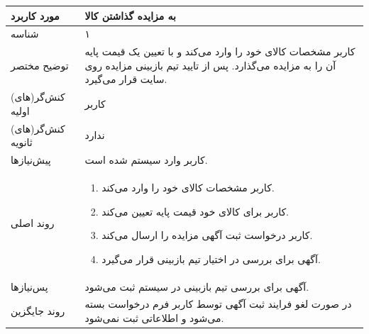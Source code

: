 \documentclass{article}
\begin{document}
\begin{center}
\bgroup
\def\arraystretch{1.5}
\begin{tabular} {|p{}|p{}|}
\hline
 مورد کاربرد & 
 به مزایده گذاشتن کالا
\\ \hline
 شناسه &
۱
\\ \hline
توضیح مختصر &
کاربر مشخصات کالای خود را وارد می‌کند و با تعیین یک قیمت پایه آن را به مزایده می‌گذارد.
پس از تایید تیم بازبینی مزایده روی سایت قرار می‌گیرد.
\\ \hline
کنش‌گر(های) اولیه &
کاربر
\\ \hline
کنش‌گر(های) ثانویه &
ندارد
\\ \hline
پیش‌نیازها &
کاربر وارد سیستم شده است.
\\ \hline
روند اصلی &
\begin{enumerate}[nosep,topsep=0cm]
\item
کاربر مشخصات کالای خود را وارد می‌کند.
\item
کاربر برای کالای خود قیمت پایه تعیین می‌کند.
\item
کاربر درخواست ثبت آگهی مزایده را ارسال می‌کند.
\item
آگهی برای بررسی در اختیار تیم بازبینی قرار می‌گیرد.
\end{enumerate}
\\ \hline
پس‌نیازها &
آگهی برای بررسی تیم بازبینی در سیستم ثبت می‌شود.
\\ \hline
روند جایگزین &
در صورت لغو فرایند ثبت آگهی توسط کاربر فرم درخواست بسته می‌شود و اطلاعاتی ثبت نمی‌شود.
\\ \hline
\end{tabular}
\egroup
\end{center}

\newpage
\end{document}
